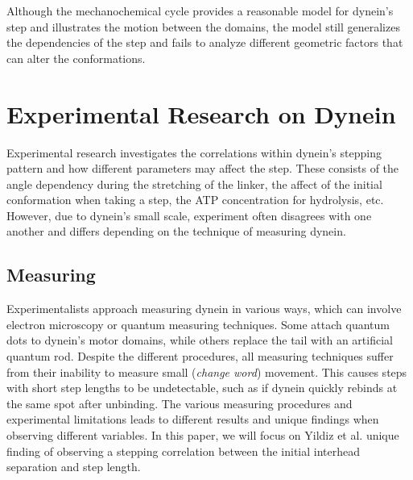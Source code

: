 Although the mechanochemical cycle provides a reasonable model for dynein's step and illustrates the motion between the domains, the model still generalizes the dependencies of the step and fails to analyze different geometric factors that can alter the conformations.


\section{Experimental Research on Dynein}

Experimental research investigates the correlations within dynein's stepping pattern and how different parameters may affect the step. These consists of the angle dependency during the stretching of the linker, the affect of the initial conformation when taking a step, the ATP concentration for hydrolysis, etc. However, due to dynein's small scale, experiment often disagrees with one another and differs depending on the technique of measuring dynein. 


\subsection{Measuring}

Experimentalists approach measuring dynein in various ways, which can involve electron microscopy or quantum measuring techniques. Some attach quantum dots to dynein's motor domains, while others replace the tail with an artificial quantum rod. Despite the different procedures, all measuring techniques suffer from their inability to measure small (\textit{change word}) movement. This causes steps with short step lengths to be undetectable, such as if dynein quickly rebinds at the same spot after unbinding. The various measuring procedures and experimental limitations leads to different results and unique findings when observing different variables. In this paper, we will focus on Yildiz et al. unique finding of observing a stepping correlation between the initial interhead separation and step length. 


